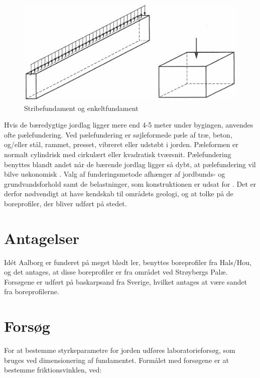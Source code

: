 \begin{figure}[htbp] \centering
	\begin{minipage}[b]{0.48\textwidth}\centering
		\includegraphics[width=1.0\textwidth]{billeder/fundament.png}
		\caption{Stribefundament og enkeltfundament \citep[ s. 221]{geoteknik}}
		\label{fig:fundament}
	\end{minipage}\hfill
\end{figure}

\newline \indent{     }  Hvis de bæredygtige jordlag ligger mere end 4-5 meter under bygingen, anvendes ofte pælefundering. Ved pælefundering er søjleformede pæle af træ, beton, og/eller stål, rammet, presset, vibreret eller udstøbt i jorden. Pæleformen er normalt cylindrisk med cirkulært eller kvadratisk tværsnit. Pælefundering benyttes blandt andet når de bærende jordlag ligger så dybt, at pælefundering vil bilve uøkonomisk \citep[ s. 355]{geoteknik}.
\newline
\newline
Valg af funderingsmetode afhænger af jordbunds- og grundvandsforhold samt de belastninger, som konstruktionen er udsat for \citep[ s. 355]{geoteknik}. Det er derfor nødvendigt at have kendskab til områdets geologi, og at tolke på de boreprofiler, der bliver udført på stedet. 

\section{Antagelser}
Idét Aalborg er funderet på meget blødt ler, benyttes boreprofiler fra Hals/Hou, og det antages, at disse boreprofiler er fra området ved Strøybergs Palæ. 
\newline \indent{     }  Forsøgene er udført på baskarpsand fra Sverige, hvilket antages at være sandet fra boreprofilerne.

\section{Forsøg}
For at bestemme styrkeparametre for jorden udføres laboratorieforsøg, som bruges ved dimensionering af fundamentet.
\newline
\newline
Formålet med forsøgene er at bestemme friktionsvinklen, ved: 

